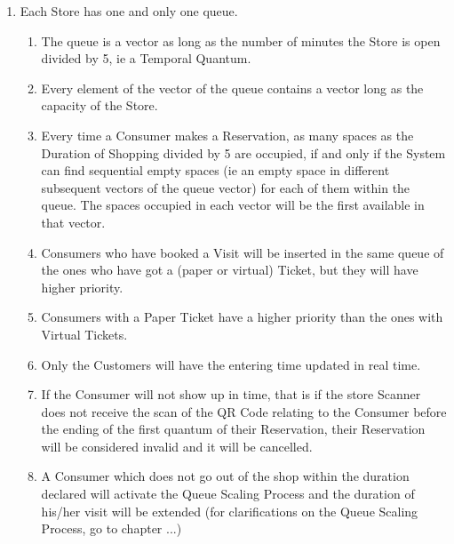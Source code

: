 \documentclass[a4paper, 10pt, oneside]{article}
\begin{document}
\begin{enumerate}[align=left]
    
    \item \label{req:queueUnique}Each Store has one and only one queue.
    \begin{enumerate}[label={-}]
        \item \label{req:codeUnique:queueVector} The queue is a vector as long as the number of minutes the Store is open divided by 5, ie a Temporal Quantum.
        \item \label{req:codeUnique:vectorOfVectors} Every element of the vector of the queue contains a vector long as the capacity of the Store. 
        \item \label{req:codeUnique:queueReservations} Every time a Consumer makes a Reservation, as many spaces as the Duration of Shopping divided by 5 are occupied, if and only if the System can find sequential empty spaces (ie an empty space in different subsequent vectors of the queue vector) for each of them within the queue. The spaces occupied in each vector will be the first available in that vector.
        \item \label{req:codeUnique:visitsAndQueue} Consumers who have booked a Visit will be inserted in the same queue of the ones who have got a (paper or virtual) Ticket, but they will have higher priority.
        \item \label{req:codeUnique:ticketsAndQueue} Consumers with a Paper Ticket have a higher priority than the ones with Virtual Tickets.
        \item Only the Customers will have the entering time updated in real time. %
        \item \label{req:codeUnique:invalidateLate} If the Consumer will not show up in time, that is if the store Scanner does not receive the scan of the QR Code relating to the Consumer before the ending of the first quantum of their Reservation, their Reservation will be considered invalid and it will be cancelled.
        \item \label{req:codeUnique:exeedDuration} A Consumer which does not go out of the shop within the duration declared will activate the Queue Scaling Process and the duration of his/her visit will be extended (for clarifications on the Queue Scaling Process, go to chapter ...)

\end{enumerate}
\end{enumerate}
\end{document}
